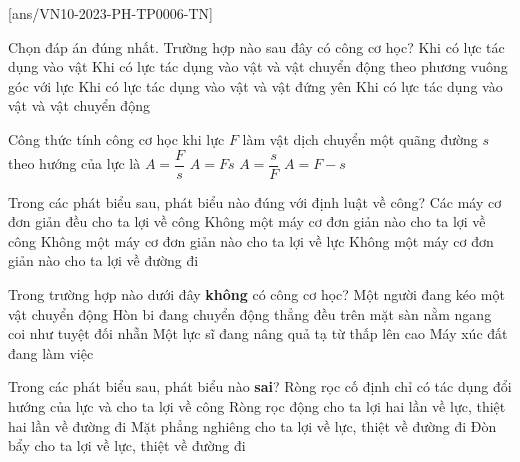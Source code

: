 \let\lesson\undefined
\newcommand{\lesson}{\phantomlesson{Ôn tập chương 6}}
\setcounter{ex}{0}
[ans/VN10-2023-PH-TP0006-TN]
\begin{ex}
Chọn đáp án đúng nhất. Trường hợp nào sau đây có công cơ học?	
	\choice
	{Khi có lực tác dụng vào vật}
	{Khi có lực tác dụng vào vật và vật chuyển động theo phương vuông góc với lực}
	{Khi có lực tác dụng vào vật và vật đứng yên}
	{\True Khi có lực tác dụng vào vật và vật chuyển động}
	\loigiai{}
\end{ex}
\begin{ex}
	Công thức tính công cơ học khi lực $F$ làm vật dịch chuyển một quãng đường $s$ theo hướng của lực là	
	\choice
	{$A=\dfrac{F}{s}$}
	{\True $A=Fs$}
	{$A=\dfrac{s}{F}$}
	{$A=F-s$}
\end{ex}
\begin{ex}
	Trong các phát biểu sau, phát biểu nào đúng với định luật về công?
	\choice
	{Các máy cơ đơn giản đều cho ta lợi về công}
	{\True Không một máy cơ đơn giản nào cho ta lợi về công}
	{Không một máy cơ đơn giản nào cho ta lợi về lực}
	{Không một máy cơ đơn giản nào cho ta lợi về đường đi}
\end{ex}
\begin{ex}
	Trong trường hợp nào dưới đây \textbf{không} có công cơ học?	
	\choice
	{Một người đang kéo một vật chuyển động}
	{\True Hòn bi đang chuyển động thẳng đều trên mặt sàn nằm ngang coi như tuyệt đối nhẵn}
	{Một lực sĩ đang nâng quả tạ từ thấp lên cao}
	{Máy xúc đất đang làm việc}
\end{ex}
\begin{ex}
	Trong các phát biểu sau, phát biểu nào \textbf{sai}?	
	\choice
	{\True Ròng rọc cố định chỉ có tác dụng đổi hướng của lực và cho ta lợi về công}
	{Ròng rọc động cho ta lợi hai lần về lực, thiệt hai lần về đường đi}
	{Mặt phẳng nghiêng cho ta lợi về lực, thiệt về đường đi}
	{Đòn bẩy cho ta lợi về lực, thiệt về đường đi}
\end{ex}
